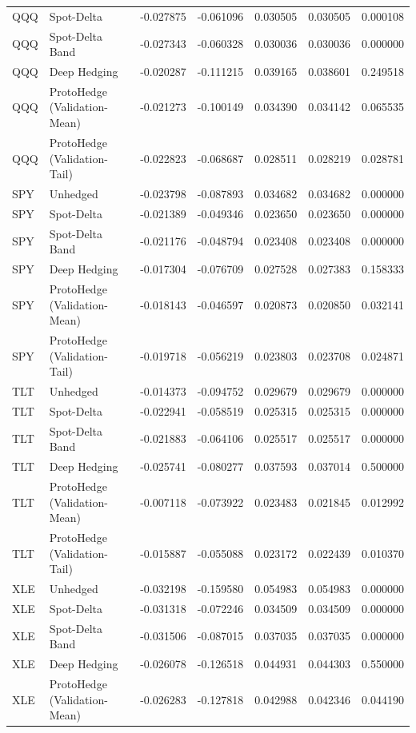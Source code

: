 \begin{tabular}{llrrrrr}
QQQ & Spot-Delta & -0.027875 & -0.061096 & 0.030505 & 0.030505 & 0.000108 \\
QQQ & Spot-Delta Band & -0.027343 & -0.060328 & 0.030036 & 0.030036 & 0.000000 \\
QQQ & Deep Hedging & -0.020287 & -0.111215 & 0.039165 & 0.038601 & 0.249518 \\
QQQ & ProtoHedge (Validation-Mean) & -0.021273 & -0.100149 & 0.034390 & 0.034142 & 0.065535 \\
QQQ & ProtoHedge (Validation-Tail) & -0.022823 & -0.068687 & 0.028511 & 0.028219 & 0.028781 \\
SPY & Unhedged & -0.023798 & -0.087893 & 0.034682 & 0.034682 & 0.000000 \\
SPY & Spot-Delta & -0.021389 & -0.049346 & 0.023650 & 0.023650 & 0.000000 \\
SPY & Spot-Delta Band & -0.021176 & -0.048794 & 0.023408 & 0.023408 & 0.000000 \\
SPY & Deep Hedging & -0.017304 & -0.076709 & 0.027528 & 0.027383 & 0.158333 \\
SPY & ProtoHedge (Validation-Mean) & -0.018143 & -0.046597 & 0.020873 & 0.020850 & 0.032141 \\
SPY & ProtoHedge (Validation-Tail) & -0.019718 & -0.056219 & 0.023803 & 0.023708 & 0.024871 \\
TLT & Unhedged & -0.014373 & -0.094752 & 0.029679 & 0.029679 & 0.000000 \\
TLT & Spot-Delta & -0.022941 & -0.058519 & 0.025315 & 0.025315 & 0.000000 \\
TLT & Spot-Delta Band & -0.021883 & -0.064106 & 0.025517 & 0.025517 & 0.000000 \\
TLT & Deep Hedging & -0.025741 & -0.080277 & 0.037593 & 0.037014 & 0.500000 \\
TLT & ProtoHedge (Validation-Mean) & -0.007118 & -0.073922 & 0.023483 & 0.021845 & 0.012992 \\
TLT & ProtoHedge (Validation-Tail) & -0.015887 & -0.055088 & 0.023172 & 0.022439 & 0.010370 \\
XLE & Unhedged & -0.032198 & -0.159580 & 0.054983 & 0.054983 & 0.000000 \\
XLE & Spot-Delta & -0.031318 & -0.072246 & 0.034509 & 0.034509 & 0.000000 \\
XLE & Spot-Delta Band & -0.031506 & -0.087015 & 0.037035 & 0.037035 & 0.000000 \\
XLE & Deep Hedging & -0.026078 & -0.126518 & 0.044931 & 0.044303 & 0.550000 \\
XLE & ProtoHedge (Validation-Mean) & -0.026283 & -0.127818 & 0.042988 & 0.042346 & 0.044190 \\

\end{tabular}
